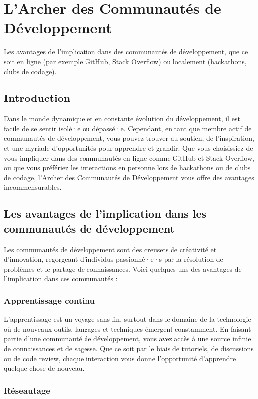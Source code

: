 \chapter{L'Archer des Communautés de Développement}

Les avantages de l'implication dans des communautés de développement, que ce soit en ligne (par exemple GitHub, Stack Overflow) ou localement (hackathons, clubs de codage).

\section{Introduction}

Dans le monde dynamique et en constante évolution du développement, il est facile de se sentir isolé·e ou dépassé·e. Cependant, en tant que membre actif de communautés de développement, vous pouvez trouver du soutien, de l'inspiration, et une myriade d'opportunités pour apprendre et grandir. Que vous choisissiez de vous impliquer dans des communautés en ligne comme GitHub et Stack Overflow, ou que vous préfériez les interactions en personne lors de hackathons ou de clubs de codage, l'Archer des Communautés de Développement vous offre des avantages incommensurables.

\section{Les avantages de l'implication dans les communautés de développement}

Les communautés de développement sont des creusets de créativité et d'innovation, regorgeant d'individus passionné·e·s par la résolution de problèmes et le partage de connaissances. Voici quelques-uns des avantages de l'implication dans ces communautés :

\subsection{Apprentissage continu}

L'apprentissage est un voyage sans fin, surtout dans le domaine de la technologie où de nouveaux outils, langages et techniques émergent constamment. En faisant partie d'une communauté de développement, vous avez accès à une source infinie de connaissances et de sagesse. Que ce soit par le biais de tutoriels, de discussions ou de code review, chaque interaction vous donne l'opportunité d'apprendre quelque chose de nouveau.

\subsection{Réseautage}

